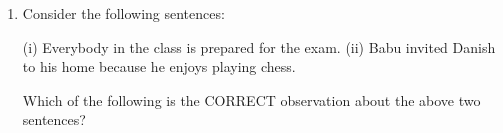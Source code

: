\documentclass[journal,12pt,onecolumn]{IEEEtran}
\theoremstyle{remark}
\begin{document}
\begin{enumerate}[start=1, label=Q.\arabic*]
\hfill{}


\item Consider the following sentences:  

(i) Everybody in the class is prepared for the exam.  
(ii) Babu invited Danish to his home because he enjoys playing chess.  

Which of the following is the CORRECT observation about the above two sentences?
\begin{enumerate}
\end{enumerate}

\hfill{}



\end{enumerate}
\end{document}
